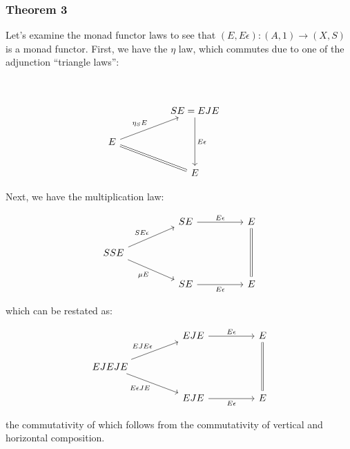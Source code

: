 \documentclass{article}
\begin{document}
\subsubsection*{Theorem 3}

Let's examine the monad functor laws to see that $(E,E \epsilon) : (A, 1) \to (X,S)$ is a monad functor.
First, we have the $\eta$ law, which commutes due to one of the adjunction ``triangle laws'':

\[\begin{tikzcd}
	&&& {} \\
	&& {SE = EJE} \\
	E \\
	&& E
	\arrow["{\eta_S E}", from=3-1, to=2-3]
	\arrow[equals, from=3-1, to=4-3]
	\arrow["{E \epsilon}", from=2-3, to=4-3]
\end{tikzcd}\]

Next, we have the multiplication law:

\[\begin{tikzcd}
	&& SE && E \\
	SSE \\
	&& SE && E
	\arrow["{SE \epsilon}", from=2-1, to=1-3]
	\arrow["{\mu E}"', from=2-1, to=3-3]
	\arrow["{E \epsilon}"', from=3-3, to=3-5]
	\arrow["{E \epsilon}", from=1-3, to=1-5]
	\arrow[equals, from=1-5, to=3-5]
\end{tikzcd}\]
 
which can be restated as:

\[\begin{tikzcd}
	&& EJE && E \\
	EJEJE \\
	&& EJE && E
	\arrow["{EJE \epsilon}", from=2-1, to=1-3]
	\arrow["{E \epsilon J E}"', from=2-1, to=3-3]
	\arrow["{E \epsilon}"', from=3-3, to=3-5]
	\arrow["{E \epsilon}", from=1-3, to=1-5]
	\arrow[equals, from=1-5, to=3-5]
\end{tikzcd}\]

the commutativity of which follows from the commutativity of vertical and horizontal composition.
\end{document}
